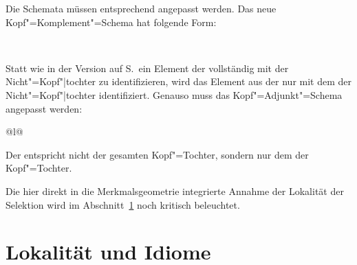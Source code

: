 \noindent
Die Schemata müssen entsprechend angepasst werden. Das neue Kopf"=Komplement"=Schema
hat folgende Form:
\begin{schema}
\label{schema-head-arg}
 \impl\\
\end{schema}
Statt wie in der Version auf S.\,\pageref{schema-Kopf-Komplementschema-prel2} ein Element
der \compsl vollständig mit der Nicht"=Kopf"|tochter zu identifizieren, wird
das Element aus der \compsl nur mit dem \synsemw der Nicht"=Kopf"|tochter identifiziert.
Genauso muss das Kopf"=Adjunkt"=Schema angepasst werden:
\begin{schema}
\label{ha-schema-final}
\begin{tabular}[t]{@{}l@{}}
 \impl\\
\end{tabular}
\end{schema}
Der \modw entspricht nicht der gesamten Kopf"=Tochter, sondern nur dem \synsemw der Kopf"=Tochter.

Die hier direkt in die Merkmalsgeometrie integrierte Annahme der Lokalität der Selektion
wird im Abschnitt~\ref{disc-lokalitaet} noch kritisch beleuchtet.


\section{Lokalität und Idiome}
\label{disc-lokalitaet}

